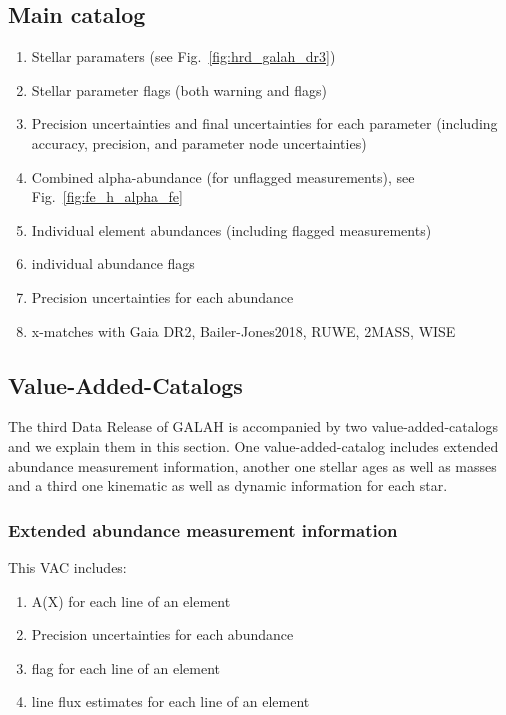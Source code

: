 \documentclass[fleqn,usenatbib,useAMS]{mnras}
\begin{document}
\subsection{Main catalog} \label{sec:main_catalog}
\begin{enumerate}
\item Stellar paramaters (see Fig.~\ref{fig:hrd_galah_dr3})
\item Stellar parameter flags (both warning and flags)
\item Precision uncertainties and final uncertainties for each parameter (including accuracy, precision, and parameter node uncertainties)
\item Combined alpha-abundance (for unflagged measurements), see Fig.~\ref{fig:fe_h_alpha_fe}
\item Individual element abundances (including flagged measurements)
\item individual abundance flags
\item Precision uncertainties for each abundance
\item x-matches with Gaia DR2, Bailer-Jones2018, RUWE, 2MASS, WISE
\end{enumerate}

\subsection{Value-Added-Catalogs} \label{sec:value_added_catalogs}

The third Data Release of GALAH is accompanied by two value-added-catalogs and we explain them in this section. One value-added-catalog includes extended abundance measurement information, another one stellar ages as well as masses and a third one kinematic as well as dynamic information for each star.

\subsubsection{Extended abundance measurement information}

This VAC includes:
\begin{enumerate}
\item A(X) for each line of an element
\item Precision uncertainties for each abundance
\item flag for each line of an element
\item line flux estimates for each line of an element
\end{enumerate}
\end{document}
